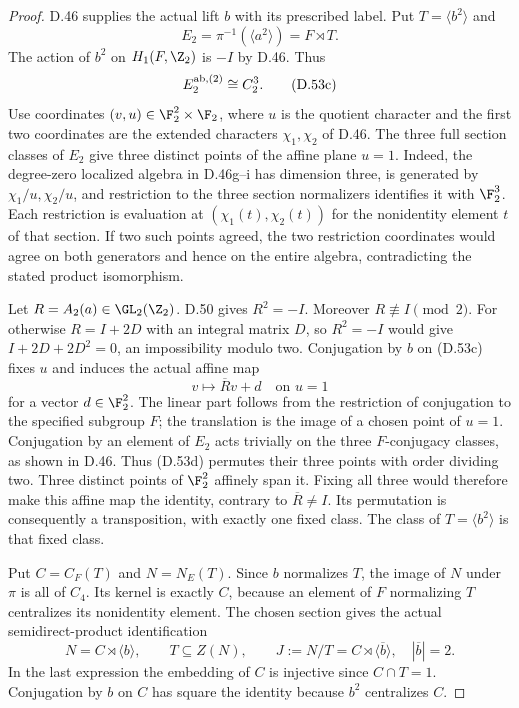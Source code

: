 \begin{proof}
D.46 supplies the actual lift $b$ with its
prescribed label. Put $T=\langle b^2\rangle$
and
\[
               E_2=\pi^{-1}(\langle a^2\rangle)
                      =F\rtimes T.
                                                               \tag{D.53b}
\]
The action of $b^2$ on $H_1(F,\Z_2)$ is
$-I$ by D.46. Thus
\[
                      E_2^{\rm ab,(2)}\cong C_2^3.
                                                               \tag{D.53c}
\]
Use coordinates $(v,u)\in\F_2^2\times\F_2$,
where $u$ is the quotient character and
the first two coordinates are the extended
characters $\chi_1,\chi_2$ of D.46.
The three full section classes of $E_2$
give three distinct points of the affine
plane $u=1$.
Indeed, the degree-zero localized algebra
in D.46g--i has dimension three, is generated
by $\chi_1/u,\chi_2/u$, and restriction to
the three section normalizers identifies
it with $\F_2^3$.
Each restriction is evaluation at
$(\chi_1(t),\chi_2(t))$ for the nonidentity
element $t$ of that section.
If two such points agreed, the two
restriction coordinates would agree on
both generators and hence on the entire
algebra, contradicting the stated product
isomorphism.

Let $R=A_2(a)\in\GL_2(\Z_2)$.
D.50 gives $R^2=-I$.
Moreover $R\not\equiv I\pmod2$.
For otherwise $R=I+2D$ with an integral
matrix $D$, so $R^2=-I$ would give
$I+2D+2D^2=0$, an impossibility modulo two.
Conjugation by $b$ on (D.53c) fixes $u$
and induces the actual affine map
\[
               v\longmapsto\overline R v+d
                        \quad\text{on }u=1             \tag{D.53d}
\]
for a vector $d\in\F_2^2$.
The linear part follows from the
restriction of conjugation to the
specified subgroup $F$; the translation
is the image of a chosen point of $u=1$.
Conjugation by an element of $E_2$
acts trivially on the three
$F$-conjugacy classes, as shown in D.46.
Thus (D.53d) permutes their three points
with order dividing two.
Three distinct points of $\F_2^2$ affinely
span it. Fixing all three would therefore
make this affine map the identity,
contrary to $\overline R\ne I$.
Its permutation is consequently a
transposition, with exactly one fixed class.
The class of $T=\langle b^2\rangle$ is
that fixed class.

Put $C=C_F(T)$ and $N=N_E(T)$.
Since $b$ normalizes $T$, the image of $N$
under $\pi$ is all of $C_4$.
Its kernel is exactly $C$, because an
element of $F$ normalizing $T$ centralizes
its nonidentity element.
The chosen section gives the actual
semidirect-product identification
\[
          N=C\rtimes\langle b\rangle,\qquad
          T\subseteq Z(N),\qquad
          J:=N/T=C\rtimes\langle\overline b\rangle,
                    \quad|\overline b|=2.              \tag{D.53e}
\]
In the last expression the embedding of
$C$ is injective since $C\cap T=1$.
Conjugation by $b$ on $C$ has square the
identity because $b^2$ centralizes $C$.


\end{proof}
